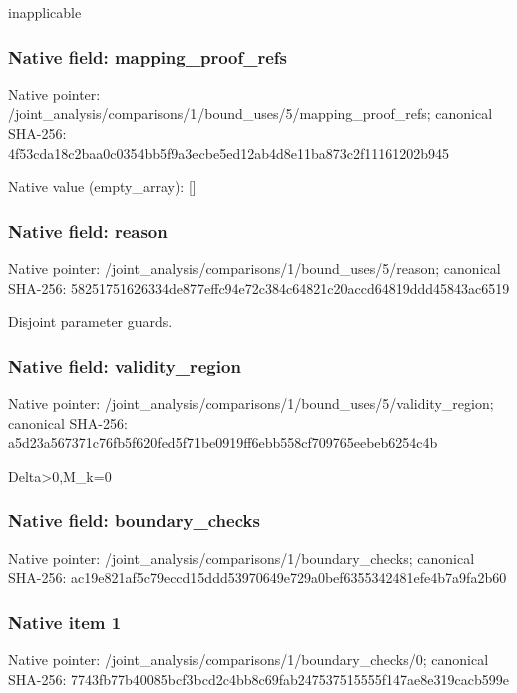 \documentclass[10pt,a4paper]{article}
\begin{document}
\begingroup\raggedright\sloppy inapplicable\par\endgroup

\subsubsection{Native field: mapping\_\allowbreak{}proof\_\allowbreak{}refs}
Native pointer: /joint\_\allowbreak{}analysis/comparisons/1/bound\_\allowbreak{}uses/5/mapping\_\allowbreak{}proof\_\allowbreak{}refs; canonical SHA-256: 4f53cda18c2baa0c0354bb5f9a3ecbe5ed12ab4d8e11ba873c2f11161202b945

Native value (empty\_\allowbreak{}array): []

\subsubsection{Native field: reason}
Native pointer: /joint\_\allowbreak{}analysis/comparisons/1/bound\_\allowbreak{}uses/5/reason; canonical SHA-256: 58251751626334de877effc94e72c384c64821c20accd64819ddd45843ac6519

\begingroup\raggedright\sloppy Disjoint parameter guards.\par\endgroup

\subsubsection{Native field: validity\_\allowbreak{}region}
Native pointer: /joint\_\allowbreak{}analysis/comparisons/1/bound\_\allowbreak{}uses/5/validity\_\allowbreak{}region; canonical SHA-256: a5d23a567371c76fb5f620fed5f71be0919ff6ebb558cf709765eebeb6254c4b

\begingroup\raggedright\sloppy Delta>0,\allowbreak{}M\_\allowbreak{}k=\allowbreak{}0\par\endgroup

\subsubsection{Native field: boundary\_\allowbreak{}checks}
Native pointer: /joint\_\allowbreak{}analysis/comparisons/1/boundary\_\allowbreak{}checks; canonical SHA-256: ac19e821af5c79eccd15ddd53970649e729a0bef6355342481efe4b7a9fa2b60

\subsubsection{Native item 1}
Native pointer: /joint\_\allowbreak{}analysis/comparisons/1/boundary\_\allowbreak{}checks/0; canonical SHA-256: 7743fb77b40085bcf3bcd2c4bb8c69fab247537515555f147ae8e319cacb599e
\end{document}
